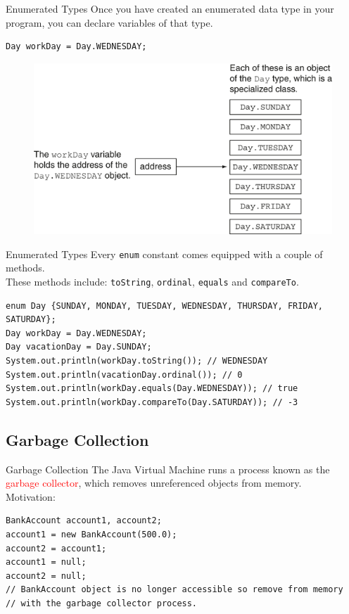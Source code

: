 \documentclass[11pt]{beamer}
\newcommand{\red}[1]{\textcolor{red}{#1}}
\begin{document}
\begin{frame}[fragile]{Enumerated Types}
    Once you have created an enumerated data type in your program, you can declare variables of that type.
    \begin{lstlisting}
Day workDay = Day.WEDNESDAY;
    \end{lstlisting}
    \noindent 
    \begin{figure}[H]
    \centering
    \includegraphics[scale=0.5]{Images/chapter08_section09_EnumVisual.png}
    \end{figure}
\end{frame}

\begin{frame}[fragile]{Enumerated Types}
    Every \texttt{enum} constant comes equipped with a couple of methods. \\ \vspace{1em}
    These methods include: \texttt{toString}, \texttt{ordinal}, \texttt{equals} and \texttt{compareTo}.
    \begin{lstlisting}
enum Day {SUNDAY, MONDAY, TUESDAY, WEDNESDAY, THURSDAY, FRIDAY, SATURDAY};
Day workDay = Day.WEDNESDAY;
Day vacationDay = Day.SUNDAY;
System.out.println(workDay.toString()); // WEDNESDAY
System.out.println(vacationDay.ordinal()); // 0
System.out.println(workDay.equals(Day.WEDNESDAY)); // true
System.out.println(workDay.compareTo(Day.SATURDAY)); // -3
    \end{lstlisting}
\end{frame}

\subsection{Garbage Collection}
\begin{frame}[fragile]{Garbage Collection}
    The Java Virtual Machine runs a process known as the \red{garbage collector}, which removes unreferenced objects from memory. \\ \vspace{1em}
    Motivation:
\begin{lstlisting}
BankAccount account1, account2;
account1 = new BankAccount(500.0);
account2 = account1;
account1 = null;
account2 = null;
// BankAccount object is no longer accessible so remove from memory
// with the garbage collector process.
\end{lstlisting}
\end{frame}
\end{document}

